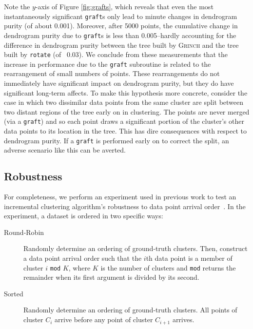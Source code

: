 \documentclass{article} \usepackage[utf8]{inputenc} \usepackage[T1]{fontenc}    \usepackage{hyperref}       \usepackage{url}            \usepackage{booktabs}       \usepackage{amsfonts}       \usepackage{nicefrac}       \usepackage{microtype}      \usepackage{geometry}
\newcommand{\alg}{\textsc{Grinch}\xspace}
\newcommand{\records}{data points\xspace}
\newcommand{\graft}{\texttt{graft}\xspace}
\newcommand{\grafts}{\texttt{graft}s\xspace}
\newcommand{\rotate}{\texttt{rotate}\xspace}
\begin{document}
Note the $y$-axis of Figure \ref{fig:grafts}, which reveals that even
the most instantaneously significant \grafts only lead to minute
changes in dendrogram purity (of about 0.001). Moreover, after 5000
points, the cumulative change in dendrogram purity due to \grafts is
less than 0.005--hardly accounting for the difference in dendrogram
purity between the tree built by \alg and the tree built by \rotate
(of ~0.03). We conclude from these measurements that the increase in
performance due to the \graft subroutine is related to the
rearrangement of small numbers of points. These rearrangements do not
immediately have significant impact on dendrogram purity, but they do
have significant long-term affects. To make this hypothesis more
concrete, consider the case in which two dissimilar data points from
the same cluster are split between two distant regions of the tree
early on in clustering. The points are never merged (via a \graft) and
so each point draws a significant portion of the cluster's other
\records to its location in the tree. This has dire consequences with
respect to dendrogram purity.  If a \graft is performed early on to
correct the split, an adverse scenario like this can be averted.

\subsection{Robustness}
\label{subsec:robust}
For completeness, we perform an experiment used in previous work to
test an incremental clustering algorithm's robustness to data point
arrival order~\cite{kobren2017hierarchical}. In the experiment, a
dataset is ordered in two specific ways:
\begin{description}
	\item[Round-Robin] Randomly determine an ordering of
          ground-truth clusters. Then, construct a data point arrival
          order such that the $i$th data point is a member of cluster $i$
          \texttt{mod} $K$, where $K$ is the number of clusters and
          \texttt{mod} returns the remainder when its first argument
          is divided by its second.
	\item[Sorted] Randomly determine an ordering of ground-truth
          clusters. All points of cluster $C_i$ arrive before any
          point of cluster $C_{i+1}$ arrives.
\end{description}
\end{document}
